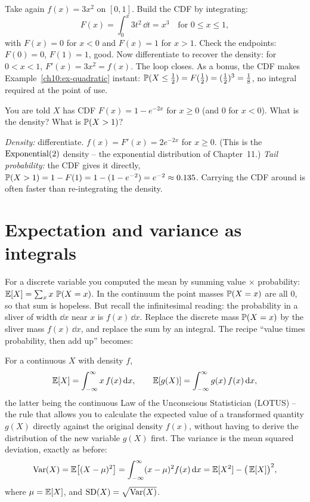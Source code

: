 \begin{example}
\label{ch10:ex-roundtrip}
Take again $f(x) = 3x^2$ on $[0,1]$. Build the CDF by integrating:
\[
  F(x) = \int_0^x 3t^2 \,\dd t = x^3 \quad \text{for } 0 \le x \le 1,
\]
with $F(x)=0$ for $x<0$ and $F(x)=1$ for $x>1$. Check the endpoints: $F(0)=0$,
$F(1)=1$, good. Now differentiate to recover the density: for $0<x<1$,
$F'(x) = 3x^2 = f(x)$. The loop closes. As a bonus, the CDF makes
Example~\ref{ch10:ex-quadratic} instant: $\P(X\le \tfrac12) = F(\tfrac12)
= (\tfrac12)^3 = \tfrac18$, no integral required at the point of use.
\end{example}

\begin{walkbox}
You are told $X$ has CDF $F(x) = 1 - e^{-2x}$ for $x \ge 0$ (and $0$ for $x<0$).
What is the density? What is $\P(X > 1)$?

\emph{Density:} differentiate. $f(x) = F'(x) = 2e^{-2x}$ for $x \ge 0$. (This is the
$\Expo(2)$ density -- the exponential distribution of Chapter~11.) \emph{Tail
probability:} the CDF gives it directly, $\P(X>1) = 1 - F(1) = 1 - (1 - e^{-2})
= e^{-2} \approx 0.135$. Carrying the CDF around is often faster than re-integrating
the density.
\end{walkbox}

\section{Expectation and variance as integrals}
\label{ch10:expectation}

For a discrete variable you computed the mean by summing value $\times$
probability:
$\E[X] = \sum_x x\,\P(X=x)$. In the continuum the point masses $\P(X=x)$ are all
$0$, so that sum is hopeless. But recall the infinitesimal reading: the probability
in a sliver of width $\dd x$ near $x$ is $f(x)\,\dd x$. Replace the discrete mass
$\P(X=x)$ by the sliver mass $f(x)\,\dd x$, and replace the sum by an integral. The
recipe ``value times probability, then add up'' becomes:

\begin{definition}
\label{ch10:def-EV}
For a continuous $X$ with density $f$,
\[
  \E[X] = \int_{-\infty}^{\infty} x\,f(x)\,\dd x,
  \qquad
  \E[g(X)] = \int_{-\infty}^{\infty} g(x)\,f(x)\,\dd x,
\]
the latter being the continuous Law of the Unconscious Statistician (LOTUS) -- the
rule that allows you to calculate the expected value of a transformed quantity
$g(X)$ directly against the original density $f(x)$, without having to derive the
distribution of the new variable $g(X)$ first. The variance is the mean squared
deviation, exactly as before:
\[
  \Var(X) = \E\!\big[(X-\mu)^2\big] = \int_{-\infty}^{\infty} (x-\mu)^2 f(x)\,\dd x
          = \E[X^2] - \big(\E[X]\big)^2,
\]
where $\mu = \E[X]$, and $\SD(X) = \sqrt{\Var(X)}$.
\end{definition}

